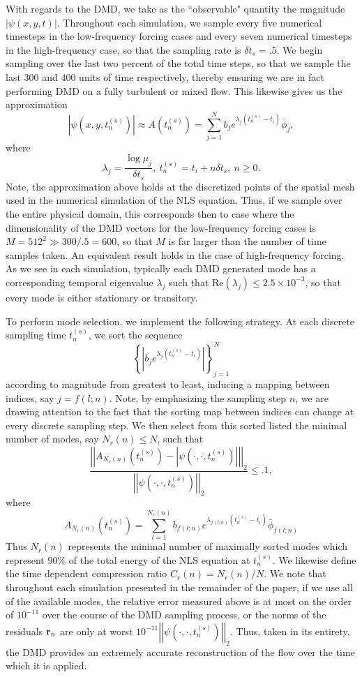 \documentclass[aps,prl,preprint,groupedaddress]{revtex4-1}
\newcommand{\gnorm}[1]{\left|\left| #1\right|\right|}
\begin{document}
With regards to the DMD, we take as the ``observable" quantity the magnitude $|\psi(x,y,t)|$.  Throughout each simulation, we sample every five numerical timesteps in the low-frequency forcing cases and every seven numerical timesteps in the high-frequency case, so that the sampling rate is $\delta t_{s}=.5$.  We begin sampling over the last two percent of the total time steps, so that we sample the last $300$ and $400$ units of time respectively, thereby ensuring we are in fact performing DMD on a fully turbulent or mixed flow.  This likewise gives us the approximation
\[
|\psi(x,y,t^{(s)}_{n})| \approx A\left(t^{(s)}_{n}\right) = \sum_{j=1}^{N} b_{j}e^{\lambda_{j}(t^{(s)}_{n}-t_{i})} \bar{\phi}_{j},  
\]
where
\[
\lambda_{j} = \frac{\log \mu_{j}}{\delta t_{s}}, ~ t^{(s)}_{n} = t_{i}  + n\delta t_{s}, ~ n\geq 0.
\]
Note, the approximation above holds at the discretized points of the spatial mesh used in the numerical simulation of the NLS equation.  Thus, if we sample over the entire physical domain, this corresponds then to case where the dimensionality of the DMD vectors for the low-frequency forcing cases is $M = 512^2 \gg 300/.5 = 600$, so that $M$ is far larger than the number of time samples taken.  An equivalent result holds in the case of high-frequency forcing.  As we see in each simulation, typically each DMD generated mode has a corresponding temporal eigenvalue $\lambda_{j}$ such that $\mbox{Re}\left(\lambda_{j}\right)\leq 2.5\times 10^{-3}$, so that every mode is either stationary or transitory.  

To perform mode selection, we implement the following strategy.  At each discrete sampling time $t^{(s)}_{n}$, we sort the sequence 
\[
\left\{ \left|  b_{j}e^{\lambda_{j}(t_{n}^{(s)}-t_{i})} \right| \right\}_{j=1}^{N}
\]
according to magnitude from greatest to least, inducing a mapping between indices, say $j=f(l;n)$.  Note, by emphasizing the sampling step $n$, we are drawing attention to the fact that the sorting map between indices can change at every discrete sampling step.  We then select from this sorted listed the minimal number of modes, say $N_{r}(n)\leq N$, such that 
\[
\frac{\gnorm{A_{N_{r}(n)}\left(t^{(s)}_{n}\right) - \left|\psi(\cdot,\cdot,t^{(s)}_{n})\right|}_{2}}{\gnorm{\psi(\cdot,\cdot,t^{(s)}_{n})}_{2}} \leq .1,
\]
where
\[
A_{N_{r}(n)}\left(t^{(s)}_{n}\right) = \sum_{l=1}^{N_{r}(n)} b_{f(l;n)}e^{\lambda_{f(l;n)}(t^{(s)}_{n}-t_{i})} \bar{\phi}_{f(l;n)}
\]
Thus $N_{r}(n)$ represents the minimal number of maximally sorted modes which represent $90\%$ of the total energy of the NLS equation at $t^{(s)}_{n}$.  We likewise define the time dependent compression ratio $C_{r}(n)=N_{r}(n)/N$.  We note that throughout each simulation presented in the remainder of the paper, if we use all of the available modes, the relative error measured above is at most on the order of $10^{-11}$ over the course of the DMD sampling process, or the norms of the residuals ${\bf r}_{n}$ are only at worst $10^{-11}\gnorm{\psi(\cdot,\cdot,t^{(s)}_{n})}_{2}$.  Thus, taken in its entirety, the DMD provides an extremely accurate reconstruction of the flow over the time which it is applied.  
\end{document}
